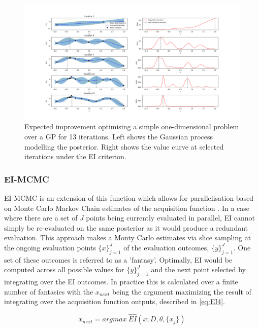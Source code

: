 			\begin{figure}[h]

			\includegraphics[trim=20 0 0 0 ,scale=0.25]{EIsimp.png}

			\caption{
			Expected improvement optimising a simple one-dimensional problem over a GP for 13 iterations. Left shows the Gaussian process modelling the posterior. Right shows the value curve at selected iterations under the EI criterion.
			}
			\label{fig:EI1}

			\end{figure}

			\subsubsection{EI-MCMC}\label{EI-MCMC}

			EI-MCMC is an extension of this function which allows for parallelisation based on Monte Carlo Markov Chain estimates of the acquisition function \cite{17}. In a case where there are a set of \textit{J} points being currently evaluated in parallel, EI cannot simply be re-evaluated on the same posterior as it would produce a redundant evaluation. This approach makes a Monty Carlo estimates via slice sampling at the ongoing evaluation points \({\{x\}}_{j=1}^J\) of the evaluation outcomes, \(\{y\}_{j=1}^J\). One set of these outcomes is referred to as a 'fantasy'. Optimally, EI would be computed across all possible values for \(\{y\}_{j=1}^J\) and the next point selected by integrating over the EI outcomes. In practice this is calculated over a finite number of fantasies with the \(x_{next}\) being the argument maximizing the result of integrating over the acquisition function outputs, described in \ref{eq:EI4}.

			\begin{equation}\label{eq:EI4} x_{next} = argmax~ \widehat{EI}(x; D, \theta,\{x_j\})\end{equation}


